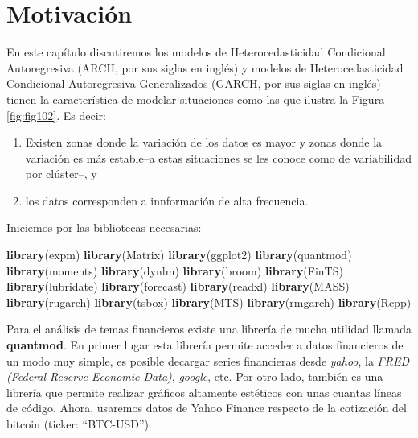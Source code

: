 \documentclass[
]{book}
\newenvironment{Shaded}{\begin{snugshade}}{\end{snugshade}}
\newcommand{\FunctionTok}[1]{\textcolor[rgb]{0.13,0.29,0.53}{\textbf{#1}}}
\newcommand{\NormalTok}[1]{#1}
\begin{document}
\hypertarget{motivaciuxf3n-1}{%
\section{Motivación}\label{motivaciuxf3n-1}}

En este capítulo discutiremos los modelos de Heterocedasticidad Condicional Autoregresiva (ARCH, por sus siglas en inglés) y modelos de Heterocedasticidad Condicional Autoregresiva Generalizados (GARCH, por sus siglas en inglés) tienen la característica de modelar situaciones como las que ilustra la Figura \ref{fig:fig102}. Es decir:

\begin{enumerate}
\def\labelenumi{\arabic{enumi})}
\item
  Existen zonas donde la variación de los datos es mayor y zonas donde la variación es más estable--a estas situaciones se les conoce como de variabilidad por clúster--, y
\item
  los datos corresponden a innformación de alta frecuencia.
\end{enumerate}

Iniciemos por las bibliotecas necesarias:

\begin{Shaded}
\begin{Highlighting}[]
\FunctionTok{library}\NormalTok{(expm)}
\FunctionTok{library}\NormalTok{(Matrix)}
\FunctionTok{library}\NormalTok{(ggplot2)}
\FunctionTok{library}\NormalTok{(quantmod)}
\FunctionTok{library}\NormalTok{(moments)}
\FunctionTok{library}\NormalTok{(dynlm)}
\FunctionTok{library}\NormalTok{(broom)}
\FunctionTok{library}\NormalTok{(FinTS)}
\FunctionTok{library}\NormalTok{(lubridate)}
\FunctionTok{library}\NormalTok{(forecast)}
\FunctionTok{library}\NormalTok{(readxl)}
\FunctionTok{library}\NormalTok{(MASS)}
\FunctionTok{library}\NormalTok{(rugarch)}
\FunctionTok{library}\NormalTok{(tsbox)}
\FunctionTok{library}\NormalTok{(MTS)}
\FunctionTok{library}\NormalTok{(rmgarch)}
\FunctionTok{library}\NormalTok{(Rcpp)}
\end{Highlighting}
\end{Shaded}

Para el análisis de temas financieros existe una librería de mucha utilidad llamada \textbf{quantmod}. En primer lugar esta librería permite acceder a datos financieros de un modo muy simple, es posible decargar series financieras desde \emph{yahoo}, la \emph{FRED (Federal Reserve Economic Data)}, \emph{google}, etc. Por otro lado, también es una librería que permite realizar gráficos altamente estéticos con unas cuantas líneas de código. Ahora, usaremos datos de Yahoo Finance respecto de la cotización del bitcoin (ticker: ``BTC-USD'').
\end{document}
